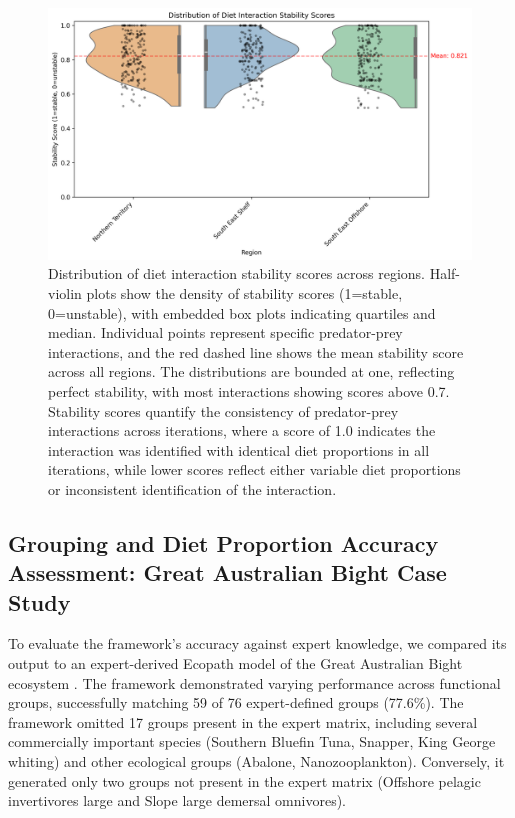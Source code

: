 \begin{figure}[htbp]
    \centering
    \includegraphics[width=\textwidth]{figures/stability_score_distribution.png}
    \caption{Distribution of diet interaction stability scores across regions. Half-violin plots show the density of stability scores (1=stable, 0=unstable), with embedded box plots indicating quartiles and median. Individual points represent specific predator-prey interactions, and the red dashed line shows the mean stability score across all regions. The distributions are bounded at one, reflecting perfect stability, with most interactions showing scores above 0.7. Stability scores quantify the consistency of predator-prey interactions across iterations, where a score of 1.0 indicates the interaction was identified with identical diet proportions in all iterations, while lower scores reflect either variable diet proportions or inconsistent identification of the interaction. }
    \label{fig:stability_distribution}
\end{figure}

\subsection{Grouping and Diet Proportion Accuracy Assessment: Great Australian Bight Case Study}

To evaluate the framework's accuracy against expert knowledge, we compared its output to an expert-derived Ecopath model of the Great Australian Bight ecosystem \citep{Fulton2018}. The framework demonstrated varying performance across functional groups, successfully matching 59 of 76 expert-defined groups (77.6\%). The framework omitted 17 groups present in the expert matrix, including several commercially important species (Southern Bluefin Tuna, Snapper, King George whiting) and other ecological groups (Abalone, Nanozooplankton). Conversely, it generated only two groups not present in the expert matrix (Offshore pelagic invertivores large and Slope large demersal omnivores).

